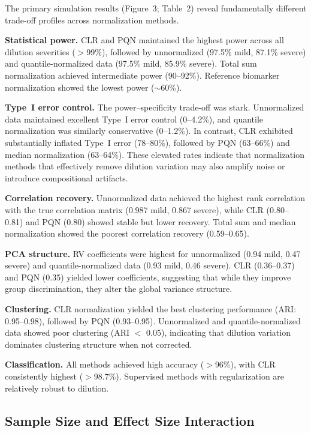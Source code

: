 \documentclass[12pt]{article}
\begin{document}
The primary simulation results (Figure~3; Table~2) reveal fundamentally different trade-off profiles across normalization methods.

\textbf{Statistical power.} CLR and PQN maintained the highest power across all dilution severities ($>$99\%), followed by unnormalized (97.5\% mild, 87.1\% severe) and quantile-normalized data (97.5\% mild, 85.9\% severe). Total sum normalization achieved intermediate power (90--92\%). Reference biomarker normalization showed the lowest power ($\sim$60\%).

\textbf{Type~I error control.} The power--specificity trade-off was stark. Unnormalized data maintained excellent Type~I error control (0--4.2\%), and quantile normalization was similarly conservative (0--1.2\%). In contrast, CLR exhibited substantially inflated Type~I error (78--80\%), followed by PQN (63--66\%) and median normalization (63--64\%). These elevated rates indicate that normalization methods that effectively remove dilution variation may also amplify noise or introduce compositional artifacts.

\textbf{Correlation recovery.} Unnormalized data achieved the highest rank correlation with the true correlation matrix (0.987 mild, 0.867 severe), while CLR (0.80--0.81) and PQN (0.80) showed stable but lower recovery. Total sum and median normalization showed the poorest correlation recovery (0.59--0.65).

\textbf{PCA structure.} RV coefficients were highest for unnormalized (0.94 mild, 0.47 severe) and quantile-normalized data (0.93 mild, 0.46 severe). CLR (0.36--0.37) and PQN (0.35) yielded lower coefficients, suggesting that while they improve group discrimination, they alter the global variance structure.

\textbf{Clustering.} CLR normalization yielded the best clustering performance (ARI: 0.95--0.98), followed by PQN (0.93--0.95). Unnormalized and quantile-normalized data showed poor clustering (ARI $<$ 0.05), indicating that dilution variation dominates clustering structure when not corrected.

\textbf{Classification.} All methods achieved high accuracy ($>$96\%), with CLR consistently highest ($>$98.7\%). Supervised methods with regularization are relatively robust to dilution.

\subsection{Sample Size and Effect Size Interaction}
\end{document}
